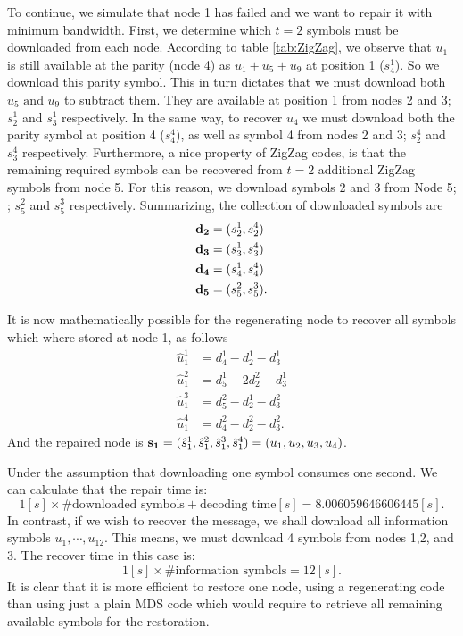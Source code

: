 \documentclass{article}
\begin{document}
To continue, we simulate that node 1 has failed and we want to repair it with minimum bandwidth. First, we determine which $t=2$ symbols must be downloaded from each node. According to table \ref{tab:ZigZag}, we observe that $u_1$ is still available at the parity (node 4) as $u_1+u_5+u_9$ at position 1 ($s_4^1$). So we download this parity symbol. This in turn dictates that we must download both $u_5 \text{ and } u_9$ to subtract them. They are available at position 1 from nodes 2  and 3; $s_2^1$ and $s_3^1$ respectively. In the same way, to recover $u_4$ we must download both the parity symbol at position 4 ($s_4^4$), as well as symbol 4 from nodes 2 and 3; $s_2^4$ and $s_3^4$ respectively. Furthermore, a nice property of ZigZag codes, is that the remaining required symbols can be recovered from $t=2$ additional ZigZag symbols from node 5. For this reason, we download symbols 2 and 3 from Node 5; ; $s_5^2$ and $s_5^3$ respectively. Summarizing, the collection of downloaded symbols are
\begin{align*}
\vb{d_2} &= (s_2^1, s_2^4) \\
\vb{d_3} &= (s_3^1, s_3^4) \\
\vb{d_4} &= (s_4^1, s_4^4) \\
\vb{d_5} &= (s_5^2, s_5^3).
\end{align*}

It is now mathematically possible for the regenerating node to recover all symbols which where stored at node 1, as follows
\begin{align*}
\hat{u}_1^1 &= d_4^1 - d_2^1 - d_3^1 \\
\hat{u}_1^2 &= d_5^1 - 2d_2^2 - d_3^1 \\
\hat{u}_1^3 &= d_5^2 - d_2^1 - d_3^2 \\
\hat{u}_1^4 &= d_4^2 - d_2^2 - d_3^2.
\end{align*}
And the repaired node is $\vb{s_1}= (\hat{s}_1^1,\hat{s}_1^2,\hat{s}_1^3, \hat{s}_1^4) = (u_1, u_2, u_3, u_4)$.

Under the assumption that downloading one symbol consumes one second. We can calculate that the repair time is:
\begin{equation*}
1[s] \times \text{\#downloaded symbols} + \text{decoding time}[s] = 8.006059646606445 [s].
\end{equation*} 
In contrast, if we wish to recover the message, we shall download all information symbols $u_1,\cdots,u_{12}$. This means, we must download 4 symbols from nodes 1,2, and 3. The recover time in this case is:
\begin{equation*}
1[s] \times \text{\#information symbols} = 12 [s].
\end{equation*} 
It is clear that it is more efficient to restore one node, using a regenerating code than using just a plain MDS code which would require to retrieve all remaining available symbols for the restoration.
\end{document}
